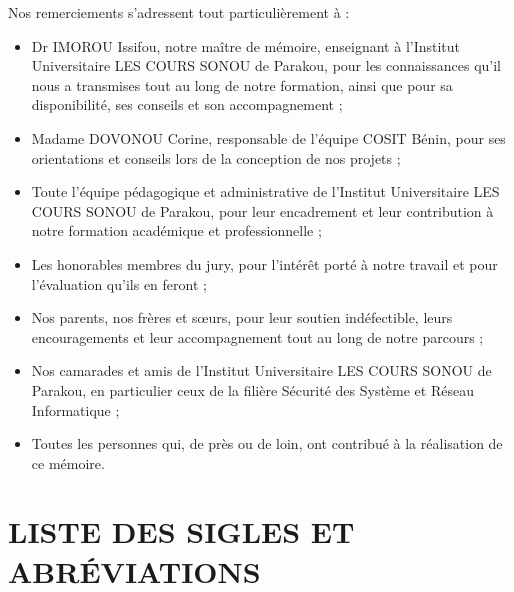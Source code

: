 \documentclass[a4paper,12pt]{report}
\begin{document}
    Nos remerciements s’adressent tout particulièrement à :
    
    \begin{itemize}
        \item Dr IMOROU Issifou, notre maître de mémoire, enseignant à l’Institut Universitaire LES COURS SONOU de Parakou, pour les connaissances qu’il nous a transmises tout au long de notre formation, ainsi que pour sa disponibilité, ses conseils et son accompagnement ;
        
        \vspace{0.5cm}
        \item Madame DOVONOU Corine, responsable de l'équipe COSIT Bénin, pour ses orientations et conseils lors de la conception de nos projets ;
        
        \vspace{0.5cm}
        \item Toute l’équipe pédagogique et administrative de l’Institut Universitaire LES COURS SONOU de Parakou, pour leur encadrement et leur contribution à notre formation académique et professionnelle ;
        
        \vspace{0.5cm}
        \item Les honorables membres du jury, pour l’intérêt porté à notre travail et pour l’évaluation qu’ils en feront ;
        
        \vspace{0.5cm}
        \item Nos parents, nos frères et sœurs, pour leur soutien indéfectible, leurs encouragements et leur accompagnement tout au long de notre parcours ;
        
        \vspace{0.5cm}
        \item Nos camarades et amis de l’Institut Universitaire LES COURS SONOU de Parakou, en particulier ceux de la filière Sécurité des Système et Réseau Informatique ;
        
        \vspace{0.5cm}
        \item Toutes les personnes qui, de près ou de loin, ont contribué à la réalisation de ce mémoire.
    \end{itemize}
    
    \chapter*{LISTE DES SIGLES ET ABRÉVIATIONS}
    
\end{document}
